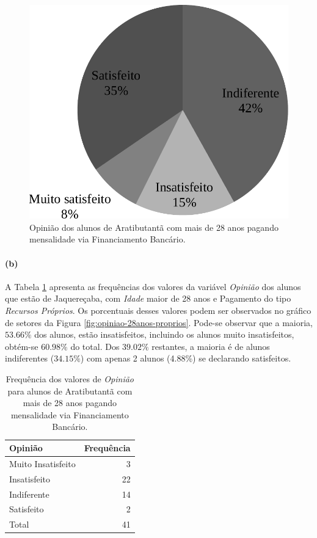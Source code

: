 \documentclass[10pt,a4paper,oneside]{article}
\newcommand{\arat}{Aratibutantã\xspace}
\newcommand{\jaqu}{Jaquereçaba\xspace}
\begin{document}
\begin{figure}[!h]
	\centering
	\includegraphics[width=.6\linewidth]{plots/q17a.pdf}
	\caption{Opinião dos alunos de \arat com mais de 28 anos pagando mensalidade via Financiamento Bancário.}
	\label{fig:opiniao-28anos-finBancario}
\end{figure}

\paragraph{(b)}

A Tabela \ref{table:opiniao-28anos-proprios} apresenta as frequências dos valores da variável \textit{Opinião} dos alunos que estão de \jaqu, com \textit{Idade} maior de 28 anos e Pagamento do tipo \textit{Recursos Próprios}. Os porcentuais desses valores podem ser observados no gráfico de setores da Figura \ref{fig:opiniao-28anos-proprios}.
Pode-se observar que a maioria, $53.66\%$ dos alunos, estão insatisfeitos, incluindo os alunos muito insatisfeitos, obtém-se $60.98\%$ do total. Dos $39.02\%$ restantes, a maioria é de alunos indiferentes ($34.15\%$) com apenas 2 alunos (4.88\%) se declarando satisfeitos.

\begin{table}[!h]
	\small
	\centering
	\caption{Frequência dos valores de \textit{Opinião} para alunos de \arat com mais de 28 anos pagando mensalidade via Financiamento Bancário.}
	\label{table:opiniao-28anos-proprios}
	\begin{tabular}{l r}
		\toprule
		\textbf{Opinião}    & \textbf{Frequência} \\
		\midrule
		Muito Insatisfeito  &  3  \\
		Insatisfeito        &  22 \\
		Indiferente         &  14 \\
		Satisfeito          &  2  \\
		\midrule
		Total               &  41 \\
		\bottomrule
	\end{tabular}
\end{table}
\end{document}
